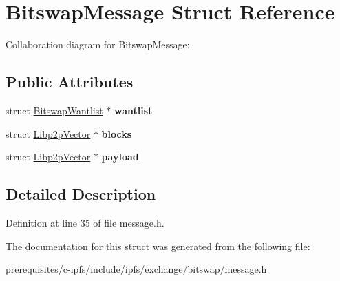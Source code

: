 \hypertarget{struct_bitswap_message}{}\section{Bitswap\+Message Struct Reference}
\label{struct_bitswap_message}


Collaboration diagram for Bitswap\+Message\+:
\subsection*{Public Attributes}
\begin{DoxyCompactItemize}
\item 
\mbox{\label{struct_bitswap_message_a2f7be9627f8d4b4788129a304ed1294e}} 
struct \mbox{\hyperlink{struct_bitswap_wantlist}{Bitswap\+Wantlist}} $\ast$ {\bfseries wantlist}
\item 
\mbox{\label{struct_bitswap_message_a1b9dc605bcfa617a33318782c472026f}} 
struct \mbox{\hyperlink{struct_libp2p_vector}{Libp2p\+Vector}} $\ast$ {\bfseries blocks}
\item 
\mbox{\label{struct_bitswap_message_acbab2475a2d0d97ce8efe1ab9bc18b46}} 
struct \mbox{\hyperlink{struct_libp2p_vector}{Libp2p\+Vector}} $\ast$ {\bfseries payload}
\end{DoxyCompactItemize}


\subsection{Detailed Description}


Definition at line 35 of file message.\+h.



The documentation for this struct was generated from the following file\+:\begin{DoxyCompactItemize}
\item 
prerequisites/c-\/ipfs/include/ipfs/exchange/bitswap/message.\+h\end{DoxyCompactItemize}
